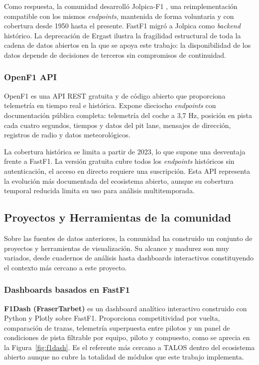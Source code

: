 \documentclass[12pt,a4paper,twoside,openright]{book}
\begin{document}
\noindent Como respuesta, la comunidad desarrolló Jolpica-F1 \cite{jolpica}, una reimplementación compatible con los mismos \textit{endpoints}, mantenida de forma voluntaria y con cobertura desde 1950 hasta el presente.
FastF1 migró a Jolpica como \textit{backend} histórico. La deprecación de Ergast ilustra la fragilidad estructural de toda la cadena de datos abiertos en la que se apoya este trabajo: la disponibilidad de los datos depende de decisiones de terceros sin compromisos de continuidad.

\subsubsection{OpenF1 API}
\noindent OpenF1 \cite{openf1} es una API REST gratuita y de código abierto que proporciona telemetría en tiempo real e histórica. Expone dieciocho \textit{endpoints} con documentación pública completa: telemetría del coche a 3,7 Hz, posición en pista cada cuatro segundos, tiempos y datos del pit lane, mensajes de dirección, registros de radio y datos meteorológicos.

\noindent La cobertura histórica se limita a partir de 2023, lo que supone una desventaja frente a FastF1. La versión gratuita cubre todos los \textit{endpoints} históricos sin autenticación, el acceso en directo requiere una suscripción.
Esta API representa la evolución más documentada del ecosistema abierto, aunque su cobertura temporal reducida limita su uso para análisis multitemporada.

\subsection{Proyectos y Herramientas de la comunidad}
Sobre las fuentes de datos anteriores, la comunidad ha construido un conjunto de proyectos y herramientas de visualización. Su alcance y madurez son muy variados, desde cuadernos de análisis hasta dashboards interactivos constituyendo el contexto más cercano a este proyecto.
\subsubsection{Dashboards basados en FastF1}
\noindent \textbf{F1Dash (FraserTarbet)} \cite{f1dash} es un dashboard analítico interactivo construido con Python y Plotly sobre FastF1. Proporciona competitividad por vuelta, comparación de trazas, telemetría superpuesta entre pilotos y un panel de condiciones de pista filtrable por equipo, piloto y compuesto, como se aprecia en la Figura~\ref{fig:f1dash}.
Es el referente más cercano a TALOS dentro del ecosistema abierto aunque no cubre la totalidad de módulos que este trabajo implementa.
\end{document}
